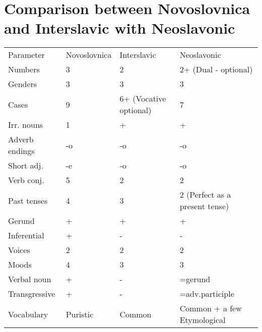 \section{Comparison between Novoslovnica and Interslavic with Neoslavonic}

\begin{table}
	\begin{tabular}{llll}
		Parameter & Novoslovnica & Interslavic & Neoslavonic \\
		Numbers & 3 & 2 & 2+ (Dual - optional) \\
		Genders & 3 & 3 & 3 \\
		Cases & 9 & 6+ (Vocative optional) & 7 \\
		Irr. nouns & 1 & + & + \\
		Adverb endings & -o & -o & -o \\
		Short adj. & -e & -o & -o \\
		Verb conj. & 5 & 2 & 2 \\
		Past tenses & 4 & 3 & 2 (Perfect as a present tense)\\
		Gerund & + & + & + \\
		Inferential & + & - & - \\
		Voices & 2 & 2 & 2 \\
		Moods & 4 & 3 & 3 \\
		Verbal noun & + & - & =gerund \\
		Transgressive & + & - & =adv.participle \\
		Vocabulary & Puristic & Common & Common + a few Etymological 
	\end{tabular}
\end{table}